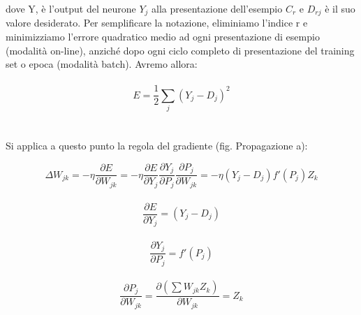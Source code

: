 \documentclass[10pt,a4paper]{article}
\begin{document}
dove Y, è l'output del neurone $Y_j$ alla presentazione dell'esempio $C_r$ e $D_{rj}$ è il
suo valore desiderato. Per semplificare la notazione, eliminiamo l'indice r e minimizziamo l'errore quadratico medio ad ogni presentazione di esempio (modalità on-line), anziché dopo ogni ciclo completo di presentazione del training set
o epoca (modalità batch). Avremo allora:
\\ \\
\begin{equation} \label{eq:eq}
E = \frac{1}{2} \sum_j{(Y_{j} - D_{j})^2}
\end{equation}
\\ \\
Si applica a questo punto la regola del gradiente (fig. Propagazione a):

\begin{equation} \label{eq:grad}
\Delta W_{jk} = - \eta \frac{\partial E}{\partial W_{jk}} = - \eta \frac{\partial E}{\partial Y_j} \frac{\partial Y_j}{\partial P_j} \frac{\partial P_j}{\partial W_{jk}} = 
-\eta(Y_j - D_j)f'(P_j)Z_k
\end{equation} \\
\begin{equation} \label{eq:dey}
\frac{\partial E}{\partial Y_j} = (Y_j - D_j)
\end{equation} \\
\begin{equation} \label{eq:dyp}
\frac{\partial Y_j}{\partial P_j} = f'(P_j) 
\end{equation} \\
\begin{equation} \label{eq:dpw}
\frac{\partial P_j}{\partial W_{jk}} = \frac{\partial(\sum W_{jk} Z_k)}{\partial W_{jk}} = Z_k
\end{equation}
\end{document}
